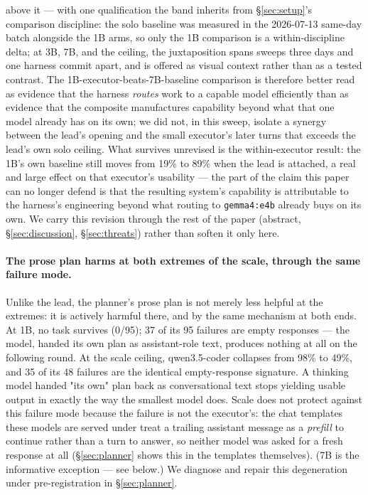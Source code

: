 \documentclass[smallcondensed,natbib]{svjour3}
\begin{document}
above it --- with one qualification the band inherits from
\S\ref{sec:setup}'s comparison discipline: the solo baseline was
measured in the 2026-07-13 same-day batch alongside the 1B arms, so
only the 1B comparison is a within-discipline delta; at 3B, 7B, and
the ceiling, the juxtaposition spans sweeps three days and one harness
commit apart, and is offered as visual context rather than as a tested
contrast. The 1B-executor-beats-7B-baseline comparison is therefore
better read as evidence that the harness \emph{routes} work to a
capable model efficiently than as evidence that the composite
manufactures capability beyond what that one model already has on its
own; we did not, in this sweep, isolate a synergy between the lead's
opening and the small executor's later turns that exceeds the lead's
own solo ceiling. What survives unrevised is the within-executor
result: the 1B's own baseline still moves from 19\% to 89\% when the
lead is attached, a real and large effect on that executor's usability
--- the part of the claim this paper can no longer defend is that the
resulting system's capability is attributable to the harness's
engineering beyond what routing to \texttt{gemma4:e4b} already buys on
its own. We carry this revision through the rest of the paper
(abstract, \S\ref{sec:discussion}, \S\ref{sec:threats}) rather than
soften it only here.

\paragraph{The prose plan harms at both extremes of the scale, through
the same failure mode.} Unlike the lead, the planner's prose plan is
not merely less helpful at the extremes: it is actively harmful there,
and by the same mechanism at both ends. At 1B, no task survives (0/95);
37 of its 95 failures are empty responses --- the model, handed its own
plan as assistant-role text, produces nothing at all on the following
round. At the scale ceiling, qwen3.5-coder collapses from 98\% to 49\%,
and 35 of its 48 failures are the identical empty-response signature.
A thinking model handed "its own" plan back as conversational text
stops yielding usable output in exactly the way the smallest model
does. Scale does not protect against this failure mode because the
failure is not the executor's: the chat templates these models are
served under treat a trailing assistant message as a \emph{prefill} to
continue rather than a turn to answer, so neither model was asked for
a fresh response at all (\S\ref{sec:planner} shows this in the
templates themselves). (7B is the informative
exception --- see below.) We diagnose and repair this degeneration under
pre-registration in \S\ref{sec:planner}.
\end{document}
